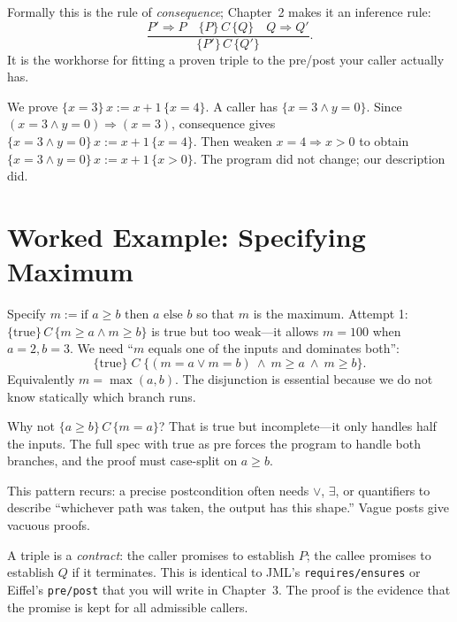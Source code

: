 Formally this is the rule of \emph{consequence}; Chapter~2 makes it an inference rule:
\[
\frac{P' \Rightarrow P \quad \{P\}\,C\,\{Q\} \quad Q \Rightarrow Q'}{\{P'\}\,C\,\{Q'\}}.
\]
It is the workhorse for fitting a proven triple to the pre/post your caller actually has.

\begin{example}
We prove $\{x=3\}\,x:=x+1\,\{x=4\}$. A caller has $\{x=3 \land y=0\}$. Since $(x=3\land y=0)\Rightarrow (x=3)$, consequence gives $\{x=3\land y=0\}\,x:=x+1\,\{x=4\}$. Then weaken $x=4 \Rightarrow x>0$ to obtain $\{x=3\land y=0\}\,x:=x+1\,\{x>0\}$. The program did not change; our description did.
\end{example}

\section{Worked Example: Specifying Maximum}
\label{sec:max-example}
Specify $m:=\text{if }a\ge b\text{ then }a\text{ else }b$ so that $m$ is the maximum. Attempt 1: $\{ \text{true}\}\,C\,\{m\ge a \land m\ge b\}$ is true but too weak—it allows $m=100$ when $a=2,b=3$. We need ``$m$ equals one of the inputs and dominates both'':
\[
\{ \text{true}\}\; C\; \{ (m=a \lor m=b)\ \land\ m\ge a\ \land\ m\ge b\}.
\]
Equivalently $m=\max(a,b)$. The disjunction is essential because we do not know statically which branch runs.

Why not $\{a\ge b\}\,C\,\{m=a\}$? That is true but incomplete—it only handles half the inputs. The full spec with $\text{true}$ as pre forces the program to handle both branches, and the proof must case-split on $a\ge b$.

This pattern recurs: a precise postcondition often needs $\lor$, $\exists$, or quantifiers to describe ``whichever path was taken, the output has this shape.'' Vague posts give vacuous proofs.

\begin{remark}
A triple is a \emph{contract}: the caller promises to establish $P$; the callee promises to establish $Q$ if it terminates. This is identical to JML's \texttt{requires/ensures} or Eiffel's \texttt{pre/post} that you will write in Chapter~3. The proof is the evidence that the promise is kept for all admissible callers.
\end{remark}

